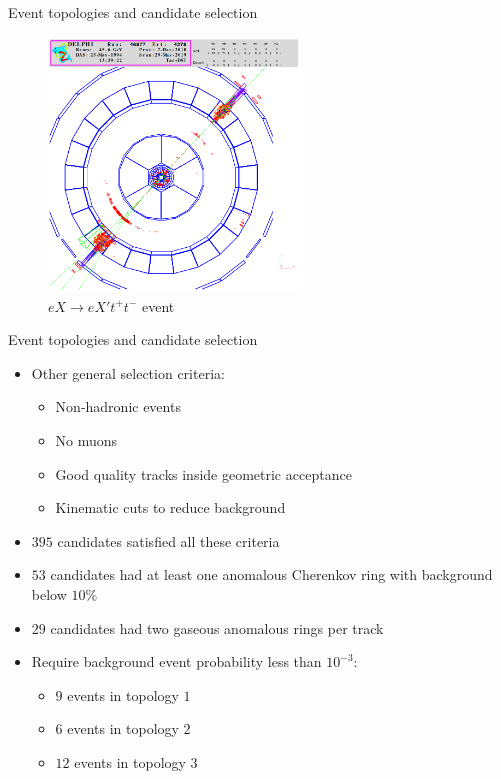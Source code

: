 \documentclass{beamer}
\begin{document}
\begin{frame}{Event topologies and candidate selection}
  \begin{figure}
    \centering
    \includegraphics[width = 0.6\textwidth]{Topology3.png}
    \caption{$eX\to eX't^+t^-$ event}
  \end{figure}
\end{frame}

\begin{frame}{Event topologies and candidate selection}
  \begin{itemize}
    \item{Other general selection criteria:}
    \begin{itemize}
      \item{Non-hadronic events}
      \item{No muons}
      \item{Good quality tracks inside geometric acceptance}
      \item{Kinematic cuts to reduce background}
    \end{itemize}
    \item{$395$ candidates satisfied all these criteria}
    \item{$53$ candidates had at least one anomalous Cherenkov ring with background below $10\%$}
    \item{$29$ candidates had two gaseous anomalous rings per track}
    \item{Require background event probability less than $10^{-3}$:}
    \begin{itemize}
      \item{$9$ events in topology $1$}
      \item{$6$ events in topology $2$}
      \item{$12$ events in topology $3$}
    \end{itemize}
  \end{itemize}
\end{frame}
\end{document}
